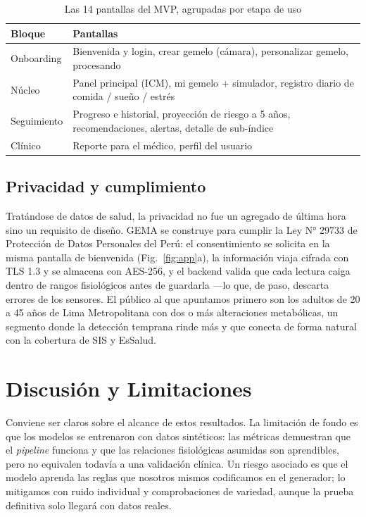 \documentclass[9pt,letterpaper,twocolumn]{extarticle}
\begin{document}
\begin{table}[t]
\caption{Las 14 pantallas del MVP, agrupadas por etapa de uso}
\label{tab:screens}
\centering
\footnotesize
\begin{tabularx}{\columnwidth}{@{}lX@{}}
\toprule
\textbf{Bloque} & \textbf{Pantallas}\\
\midrule
Onboarding   & Bienvenida y login, crear gemelo (cámara), personalizar gemelo, procesando \\[2pt]
Núcleo       & Panel principal (ICM), mi gemelo + simulador, registro diario de comida / sueño / estrés \\[2pt]
Seguimiento  & Progreso e historial, proyección de riesgo a 5 años, recomendaciones, alertas, detalle de sub-índice \\[2pt]
Clínico      & Reporte para el médico, perfil del usuario \\
\bottomrule
\end{tabularx}
\end{table}

\subsection{Privacidad y cumplimiento}
Tratándose de datos de salud, la privacidad no fue un agregado de última hora
sino un requisito de diseño. GEMA se construye para cumplir la Ley N° 29733 de
Protección de Datos Personales del Perú: el consentimiento se solicita en la
misma pantalla de bienvenida (Fig.~\ref{fig:app}a), la información viaja cifrada
con TLS 1.3 y se almacena con AES-256, y el backend valida que cada lectura caiga
dentro de rangos fisiológicos antes de guardarla ---lo que, de paso, descarta
errores de los sensores. El público al que apuntamos primero son los adultos de
20 a 45 años de Lima Metropolitana con dos o más alteraciones metabólicas, un
segmento donde la detección temprana rinde más y que conecta de forma natural con
la cobertura de SIS y EsSalud.

\section{Discusión y Limitaciones}\label{sec:disc}
Conviene ser claros sobre el alcance de estos resultados. La limitación de fondo
es que los modelos se entrenaron con datos sintéticos: las métricas demuestran
que el \emph{pipeline} funciona y que las relaciones fisiológicas asumidas son
aprendibles, pero no equivalen todavía a una validación clínica. Un riesgo
asociado es que el modelo aprenda las reglas que nosotros mismos codificamos en
el generador; lo mitigamos con ruido individual y comprobaciones de variedad,
aunque la prueba definitiva solo llegará con datos reales.
\end{document}
